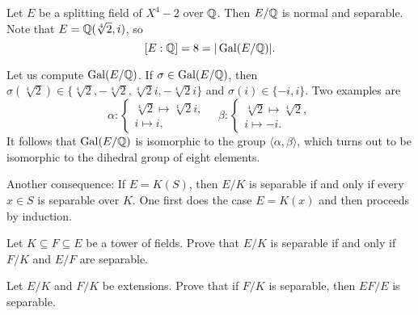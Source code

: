 \begin{example}
    Let $E$ be a splitting field of $X^4-2$ over $\mathbb{Q}$. 
    Then $E/\mathbb{Q}$ is normal and separable. Note that
    $E=\mathbb{Q}(\sqrt[4]{2},i)$, so 
    \[
    [E:\mathbb{Q}]=8=|\operatorname{Gal}(E/\mathbb{Q})|.
    \]
    
    Let us compute
    $\operatorname{Gal}(E/\mathbb{Q})$. If $\sigma\in\operatorname{Gal}(E/\mathbb{Q})$, then 
    $\sigma(\sqrt[4]{2})\in\{\sqrt[4]{2},-\sqrt[4]{2},\sqrt[4]{2}i,-\sqrt[4]{2}i\}$ and 
    $\sigma(i)\in\{-i,i\}$. Two examples are 
    \[
    \alpha\colon\begin{cases}
    \sqrt[4]{2}\mapsto\sqrt[4]{2}i,\\
    i\mapsto i,
    \end{cases}
    \quad
    \beta\colon\begin{cases}
    \sqrt[4]{2}\mapsto\sqrt[4]{2},\\
    i\mapsto -i.
    \end{cases}
    \]
    It follows that 
    $\operatorname{Gal}(E/\mathbb{Q})$ is isomorphic to the group $\langle\alpha,\beta\rangle$, which turns out to be
    isomorphic to the dihedral group
    of eight elements. 
\end{example}


Another consequence: If $E=K(S)$, then $E/K$ is separable if and only if
every $x\in S$ is separable over $K$. One first does the case $E=K(x)$ 
and then proceeds by induction. 

\begin{exercise}
\label{xca:separable1}
    Let $K\subseteq F\subseteq E$ be a tower of fields. Prove that 
    $E/K$ is separable if and only if $F/K$ and $E/F$ are separable. 
\end{exercise}



\begin{exercise}
\label{xca:separable2}
    Let $E/K$ and $F/K$ be extensions. Prove that if $F/K$ is separable, 
    then $EF/E$ is separable. 
\end{exercise}

